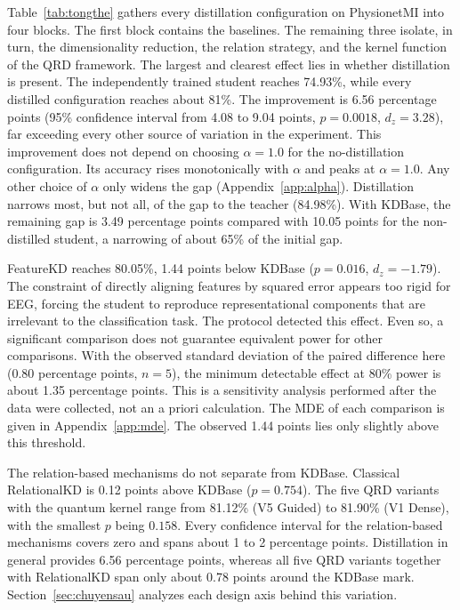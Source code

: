 Table~\ref{tab:tongthe} gathers every distillation configuration on
PhysionetMI into four blocks. The first block contains the baselines.
The remaining three isolate, in turn, the dimensionality reduction, the
relation strategy, and the kernel function of the QRD framework. The
largest and clearest effect lies in whether distillation is present.
The independently trained student reaches 74.93\%, while every
distilled configuration reaches about 81\%. The improvement is 6.56
percentage points (95\% confidence interval from 4.08 to 9.04 points,
$p = 0.0018$, $d_z = 3.28$), far exceeding every other source of
variation in the experiment. This improvement does not depend on
choosing $\alpha = 1.0$ for the no-distillation configuration. Its
accuracy rises monotonically with $\alpha$ and peaks at $\alpha = 1.0$.
Any other choice of $\alpha$ only widens the gap
(Appendix~\ref{app:alpha}). Distillation narrows most, but not all, of
the gap to the teacher (84.98\%). With KDBase, the remaining gap is 3.49
percentage points compared with 10.05 points for the non-distilled
student, a narrowing of about 65\% of the initial gap.

FeatureKD reaches 80.05\%, 1.44 points below KDBase ($p = 0.016$,
$d_z = -1.79$). The constraint of directly aligning features by squared
error appears too rigid for EEG, forcing the student to reproduce
representational components that are irrelevant to the classification
task. The protocol detected this effect. Even so, a significant
comparison does not guarantee equivalent power for other comparisons.
With the observed standard deviation of the paired difference here
(0.80 percentage points, $n=5$), the minimum detectable effect at 80\% power is about 1.35 percentage points.
This is a sensitivity analysis performed after the data were collected,
not an a priori calculation. The MDE of each comparison is given in
Appendix~\ref{app:mde}.
The observed 1.44 points lies only slightly above this threshold.

The relation-based mechanisms do not separate from KDBase. Classical
RelationalKD is 0.12 points above KDBase ($p = 0.754$). The five QRD
variants with the quantum kernel range from 81.12\% (V5 Guided) to
81.90\% (V1 Dense), with the smallest $p$ being $0.158$. Every
confidence interval for the relation-based mechanisms covers zero and
spans about 1 to 2 percentage points. Distillation in general provides
6.56 percentage points, whereas all five QRD variants together with
RelationalKD span only about 0.78 points around the KDBase mark.
Section~\ref{sec:chuyensau} analyzes each design axis behind this
variation.

